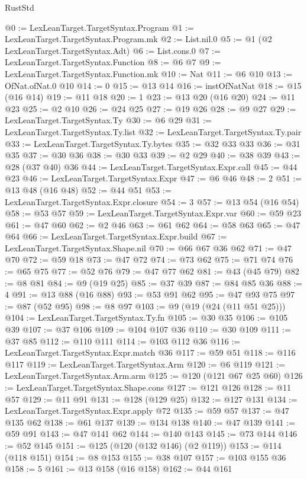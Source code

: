 \begin{lexlean}{RustStd}
\begin{coremodule}
@0 := LexLeanTarget.TargetSyntax.Program
@1 := LexLeanTarget.TargetSyntax.Program.mk
@2 := List.nil.{0}
@5 := @1 (@2 LexLeanTarget.TargetSyntax.Adt)
@6 := List.cons.{0}
@7 := LexLeanTarget.TargetSyntax.Function
@8 := @6 @7
@9 := LexLeanTarget.TargetSyntax.Function.mk
@10 := Nat
@11 := @6 @10
@13 := OfNat.ofNat.{0} @10
@14 := 0
@15 := @13 @14
@16 := instOfNatNat
@18 := @15 (@16 @14)
@19 := @11 @18
@20 := 1
@23 := @13 @20 (@16 @20)
@24 := @11 @23
@25 := @2 @10
@26 := @24 @25
@27 := @19 @26
@28 := @9 @27
@29 := LexLeanTarget.TargetSyntax.Ty
@30 := @6 @29
@31 := LexLeanTarget.TargetSyntax.Ty.list
@32 := LexLeanTarget.TargetSyntax.Ty.pair
@33 := LexLeanTarget.TargetSyntax.Ty.bytes
@35 := @32 @33 @33
@36 := @31 @35
@37 := @30 @36
@38 := @30 @33
@39 := @2 @29
@40 := @38 @39
@43 := @28 (@37 @40) @36
@44 := LexLeanTarget.TargetSyntax.Expr.call
@45 := @44 @23
@46 := LexLeanTarget.TargetSyntax.Expr
@47 := @6 @46
@48 := 2
@51 := @13 @48 (@16 @48)
@52 := @44 @51
@53 := LexLeanTarget.TargetSyntax.Expr.closure
@54 := 3
@57 := @13 @54 (@16 @54)
@58 := @53 @57
@59 := LexLeanTarget.TargetSyntax.Expr.var
@60 := @59 @23
@61 := @47 @60
@62 := @2 @46
@63 := @61 @62
@64 := @58 @63
@65 := @47 @64
@66 := LexLeanTarget.TargetSyntax.Expr.build
@67 := LexLeanTarget.TargetSyntax.Shape.nil
@70 := @66 @67 @36 @62
@71 := @47 @70
@72 := @59 @18
@73 := @47 @72
@74 := @73 @62
@75 := @71 @74
@76 := @65 @75
@77 := @52 @76
@79 := @47 @77 @62
@81 := @43 (@45 @79)
@82 := @8 @81
@84 := @9 (@19 @25)
@85 := @37 @39
@87 := @84 @85 @36
@88 := 4
@91 := @13 @88 (@16 @88)
@93 := @53 @91 @62
@95 := @47 @93 @75
@97 := @87 (@52 @95)
@98 := @8 @97
@103 := @9 (@19 (@24 (@11 @51 @25)))
@104 := LexLeanTarget.TargetSyntax.Ty.fn
@105 := @30 @35
@106 := @105 @39
@107 := @37 @106
@109 := @104 @107 @36
@110 := @30 @109
@111 := @37 @85
@112 := @110 @111
@114 := @103 @112 @36
@116 := LexLeanTarget.TargetSyntax.Expr.match @36
@117 := @59 @51
@118 := @116 @117
@119 := LexLeanTarget.TargetSyntax.Arm
@120 := @6 @119
@121 := LexLeanTarget.TargetSyntax.Arm.arm
@125 := @120 (@121 @67 @25 @60)
@126 := LexLeanTarget.TargetSyntax.Shape.cons
@127 := @121 @126
@128 := @11 @57
@129 := @11 @91
@131 := @128 (@129 @25)
@132 := @127 @131
@134 := LexLeanTarget.TargetSyntax.Expr.apply @72
@135 := @59 @57
@137 := @47 @135 @62
@138 := @61 @137
@139 := @134 @138
@140 := @47 @139
@141 := @59 @91
@143 := @47 @141 @62
@144 := @140 @143
@145 := @73 @144
@146 := @52 @145
@151 := @125 (@120 (@132 @146) (@2 @119))
@153 := @114 (@118 @151)
@154 := @8 @153
@155 := @38 @107
@157 := @103 @155 @36
@158 := 5
@161 := @13 @158 (@16 @158)
@162 := @44 @161

\end{coremodule}
\end{lexlean}
